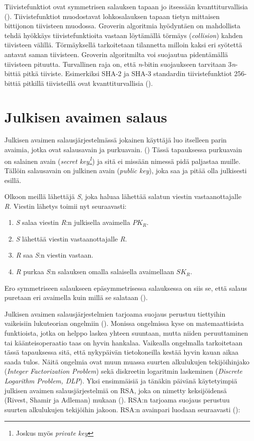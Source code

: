  Tiivistefunktiot ovat symmetrisen salauksen tapaan jo itsessään kvanttiturvallisia (\cite{mavroeidis2018impact}). Tiivistefunktiot muodostavat lohkosalauksen tapaan tietyn mittaisen bittijonon tiivisteen muodossa. Groverin algoritmia hyödyntäen on mahdollista tehdä hyökkäys tiivistefunktioita vastaan löytämällä törmäys (\emph{collision}) kahden tiivisteen välillä. Törmäyksellä tarkoitetaan tilannetta milloin kaksi eri syötettä antavat saman tiivisteen. %
 Groverin algoritmilta voi suojautua pidentämällä tiivisteen pituutta. Turvallinen raja on, että \emph{n}-bitin suojaukseen tarvitaan 3\emph{n}-bittiä pitkä tiiviste. Esimerkiksi SHA-2 ja SHA-3 standardin tiivistefunktiot 256-bittiä pitkillä tiivisteillä ovat kvanttiturvallisia (\cite{mavroeidis2018impact, buchmann2016post}).
 
 \section{Julkisen avaimen salaus}
 Julkisen avaimen salausjärjestelmässä jokainen käyttäjä luo itselleen parin avaimia, jotka ovat salausavain ja purkuavain. (\cite{bellare2005introduction}) Tässä tapauksessa purkuavain on salainen avain (\emph{secret key\footnote{Joskus myös \emph{private key}}}) ja sitä ei missään nimessä pidä paljastaa muille. Tällöin salausavain on julkinen avain (\emph{public key}), joka saa ja pitää olla julkisesti esillä.
 
 Olkoon meillä lähettäjä \emph{S}, joka haluaa lähettää salatun viestin vastaanottajalle \emph{R}. Viestin lähetys toimii nyt seuraavasti:
 \begin{enumerate}
     \item \emph{S} salaa viestin \emph{R}:n julkisella avaimella $PK_{R}$.
     \item \emph{S} lähettää viestin vastaanottajalle \emph{R}.
     \item \emph{R} saa \emph{S}:n viestin vastaan.
     \item \emph{R} purkaa \emph{S}:n salauksen omalla salaisella avaimellaan $SK_{R}$.
 \end{enumerate}
Ero symmetriseen salaukseen epäsymmetrisessa salauksessa on siis se, että salaus puretaan eri avaimella kuin millä se salataan (\cite{bellare2005introduction}).
 
  Julkisen avaimen salausjärjestelmien tarjoama suojaus perustuu tiettyihin vaikeisiin lukuteorian ongelmiin (\cite{mavroeidis2018impact}). Monissa ongelmissa kyse on matemaattisista funktioista, jotka on helppo laskea yhteen suuntaan, mutta niiden peruuttaminen tai käänteisoperaatio taas on hyvin hankalaa. Vaikealla ongelmalla tarkoitetaan tässä tapauksessa sitä, että nykypäivän tietokoneilla kestää hyvin kauan aikaa saada tulos. Näitä ongelmia ovat muun muassa suurten alkulukujen tekijöihinjako (\emph{Integer Factorization Problem}) sekä diskreetin logaritmin laskeminen (\emph{Discrete Logarithm Problem, DLP}).
  Yksi ensimmäisiä ja tänäkin päivänä käytetyimpiä julkisen avaimen salausjärjestelmiä on RSA, joka on nimetty keksijöidensä (Rivest, Shamir ja Adleman) mukaan (\cite{montgomery1994survey}). RSA:n tarjoama suojaus perustuu suurten alkulukujen tekijöihin jakoon. RSA:n avainpari luodaan seuraavasti  (\cite{10.1145/359340.359342}):
  
